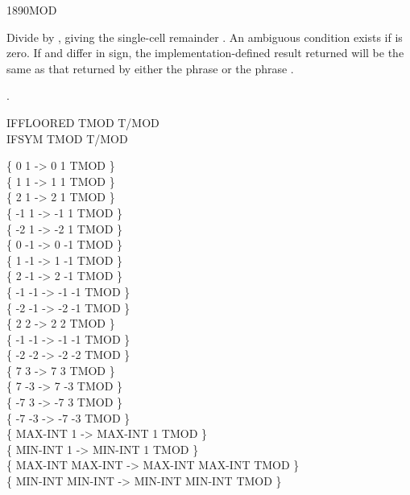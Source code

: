 \begin{worddef}{1890}{MOD}
\item {}

	Divide  by , giving the single-cell remainder
	. An ambiguous condition exists if  is zero.
	If  and  differ in sign, the
	implementation-defined result returned will be the same as that
	returned by either the phrase
	    
	or the phrase
	    .

\see {}.

	\begin{defer}
	\testing
		IFFLOORED \tab 	\word{:} TMOD T/MOD  \word{;} \\
		IFSYM \tab[2.6]	\word{:} TMOD T/MOD  \word{;}

		\{       0       1  ->       0       1 TMOD \} \\
		\{       1       1  ->       1       1 TMOD \} \\
		\{       2       1  ->       2       1 TMOD \} \\
		\{      -1       1  ->      -1       1 TMOD \} \\
		\{      -2       1  ->      -2       1 TMOD \} \\
		\{       0      -1  ->       0      -1 TMOD \} \\
		\{       1      -1  ->       1      -1 TMOD \} \\
		\{       2      -1  ->       2      -1 TMOD \} \\
		\{      -1      -1  ->      -1      -1 TMOD \} \\
		\{      -2      -1  ->      -2      -1 TMOD \} \\
		\{       2       2  ->       2       2 TMOD \} \\
		\{      -1      -1  ->      -1      -1 TMOD \} \\
		\{      -2      -2  ->      -2      -2 TMOD \} \\
		\{       7       3  ->       7       3 TMOD \} \\
		\{       7      -3  ->       7      -3 TMOD \} \\
		\{      -7       3  ->      -7       3 TMOD \} \\
		\{      -7      -3  ->      -7      -3 TMOD \} \\
		\{ MAX-INT       1  -> MAX-INT       1 TMOD \} \\
		\{ MIN-INT       1  -> MIN-INT       1 TMOD \} \\
		\{ MAX-INT MAX-INT  -> MAX-INT MAX-INT TMOD \} \\
		\{ MIN-INT MIN-INT  -> MIN-INT MIN-INT TMOD \}
	\end{defer}
\end{worddef}


